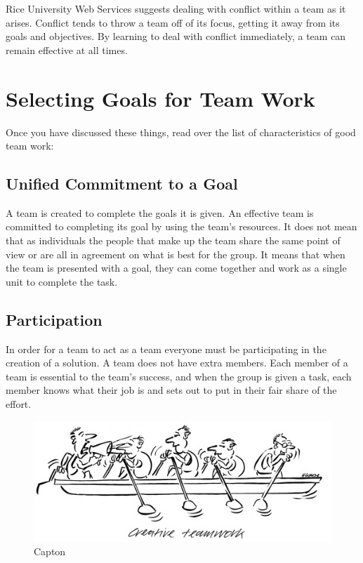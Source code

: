 \documentclass{article}\usepackage[]{graphicx}\usepackage[]{color}
\begin{document}
Rice University Web Services suggests dealing with conflict within a team as it arises. Conflict tends to throw a team off of its focus, getting it away from its goals and objectives. By learning to deal with conflict immediately, a team can remain effective at all times.

\section{Selecting Goals for Team Work} 

Once you have discussed these things, read over the list of characteristics of good team work: 

\subsection{Unified Commitment to a Goal}
A team is created to complete the goals it is given. An effective team is committed to completing its goal by using the team's resources. It does not mean that as individuals the people that make up the team share the same point of view or are all in agreement on what is best for the group. It means that when the team is presented with a goal, they can come together and work as a single unit to complete the task.

\subsection{Participation}
In order for a team to act as a team everyone must be participating in the creation of a solution. A team does not have extra members. Each member of a team is essential to the team's success, and when the group is given a task, each member knows what their job is and sets out to put in their fair share of the effort.

\begin{figure}
\includegraphics[width=1.00\textwidth]{../figure/creative_teamwork.jpg}
\caption{Capton}
\end{figure}
\end{document}
